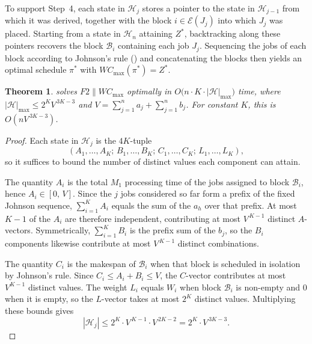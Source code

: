 \documentclass[12pt]{article}
\newtheorem{theorem}{Theorem}[section]
\begin{document}
\begin{sloppypar}
        To support Step~4, each state in $\mathscr{H}_j$ stores a pointer to the state in $\mathscr{H}_{j-1}$
        from which it was derived, together with the block $i \in \mathcal{E}(J_j)$ into which $J_j$ was
        placed. Starting from a state in $\mathscr{H}_n$ attaining $Z^{*}$, backtracking along these pointers
        recovers the block $\mathcal{B}_i$ containing each job $J_j$. Sequencing the jobs of each block
        according to Johnson's rule () and concatenating the blocks then yields
        an optimal schedule $\pi^{*}$ with $W C_{\max}(\pi^{*}) = Z^{*}$.
        
        \begin{theorem}\label{thm:complexity}
             solves $F2 \parallel W C_{\max}$ optimally in
            $O\bigl(n \cdot K \cdot |\mathscr{H}|_{\max}\bigr)$ time, where
            $|\mathscr{H}|_{\max} \le 2^{K}V^{\,3K-3}$ and $V = \sum_{j=1}^{n}a_j + \sum_{j=1}^{n}b_j$.
            For constant $K$, this is $O(nV^{\,3K-3})$.
        \end{theorem}
        
        \begin{proof}
            Each state in $\mathscr{H}_j$ is the $4K$-tuple
            \[
            (A_1,\dots,A_K;\, B_1,\dots,B_K;\, C_1,\dots,C_K;\, L_1,\dots,L_K),
            \]
            so it suffices to bound the number of distinct values each component can attain.
            
            The quantity $A_i$ is the total $M_1$ processing time of the jobs assigned to block
            $\mathcal{B}_i$, hence $A_i \in [0,\,V]$. Since the $j$ jobs considered so far form a prefix of the
            fixed Johnson sequence, $\sum_{i=1}^{K} A_i$ equals the sum of the $a_h$ over that prefix. At most
            $K-1$ of the $A_i$ are therefore independent, contributing at most $V^{\,K-1}$ distinct
            $A$-vectors. Symmetrically, $\sum_{i=1}^{K} B_i$ is the prefix sum of the $b_j$, so the $B_i$
            components likewise contribute at most $V^{\,K-1}$ distinct combinations.
            
            The quantity $C_i$ is the makespan of $\mathcal{B}_i$ when that block is scheduled in isolation by
            Johnson's rule. Since $C_i \le A_i + B_i \le V$, the $C$-vector contributes at most $V^{K-1}$
            distinct values. The weight $L_i$ equals $W_i$ when block $\mathcal{B}_i$ is non-empty and $0$ when
            it is empty, so the $L$-vector takes at most $2^K$ distinct values. Multiplying these bounds gives
            \[
            |\mathscr{H}_{j}| \le 2^K \cdot V^{\,K-1} \cdot V^{\,2K-2} = 2^K \cdot V^{\,3K-3}.
            \]
            

\end{proof}
\end{sloppypar}
\end{document}
